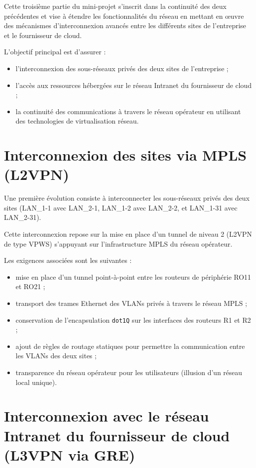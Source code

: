 \documentclass[11pt,a4paper]{memoir}%
\begin{document}
	Cette troisième partie du mini-projet s’inscrit dans la continuité des deux précédentes et vise à étendre les fonctionnalités du réseau en mettant en œuvre des mécanismes d’interconnexion avancés entre les différents sites de l’entreprise et le fournisseur de cloud.
	
	L’objectif principal est d’assurer :
	\begin{itemize}
		\item l’interconnexion des sous-réseaux privés des deux sites de l’entreprise ;
		\item l’accès aux ressources hébergées sur le réseau Intranet du fournisseur de cloud ;
		\item la continuité des communications à travers le réseau opérateur en utilisant des technologies de virtualisation réseau.
	\end{itemize}
	
	\section{Interconnexion des sites via MPLS (L2VPN)}
	
	Une première évolution consiste à interconnecter les sous-réseaux privés des deux sites (LAN\_1-1 avec LAN\_2-1, LAN\_1-2 avec LAN\_2-2, et LAN\_1-31 avec LAN\_2-31).
	
	Cette interconnexion repose sur la mise en place d’un tunnel de niveau 2 (L2VPN de type VPWS) s’appuyant sur l’infrastructure MPLS du réseau opérateur.
	
	Les exigences associées sont les suivantes :
	\begin{itemize}
		\item mise en place d’un tunnel point-à-point entre les routeurs de périphérie RO11 et RO21 ;
		\item transport des trames Ethernet des VLANs privés à travers le réseau MPLS ;
		\item conservation de l’encapsulation \texttt{dot1Q} sur les interfaces des routeurs R1 et R2 ;
		\item ajout de règles de routage statiques pour permettre la communication entre les VLANs des deux sites ;
		\item transparence du réseau opérateur pour les utilisateurs (illusion d’un réseau local unique).
	\end{itemize}
	
	\section{Interconnexion avec le réseau Intranet du fournisseur de cloud (L3VPN via GRE)}
	
\end{document}
